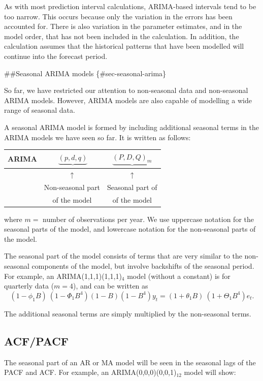 \documentclass[]{book}
\begin{document}
As with most prediction interval calculations, ARIMA-based intervals tend to be too narrow. This occurs because only the variation in the errors has been accounted for. There is also variation in the parameter estimates, and in the model order, that has not been included in the calculation. In addition, the calculation assumes that the historical patterns that have been modelled will continue into the forecast period.

\#\#Seasonal ARIMA models \{\#sec-seasonal-arima\}

So far, we have restricted our attention to non-seasonal data and non-seasonal ARIMA models. However, ARIMA models are also capable of modelling a wide range of seasonal data.

A seasonal ARIMA model is formed by including additional seasonal terms in the ARIMA models we have seen so far. It is written as follows:

\begin{longtable}[]{@{}rcc@{}}
\toprule
ARIMA & \(~\underbrace{(p, d, q)}\) & \(\underbrace{(P, D, Q)_{m}}\)\tabularnewline
\midrule
\endhead
& \({\uparrow}\) & \({\uparrow}\)\tabularnewline
& Non-seasonal part & Seasonal part of\tabularnewline
& of the model & of the model\tabularnewline
\bottomrule
\end{longtable}

where \(m =\) number of observations per year. We use uppercase notation for the seasonal parts of the model, and lowercase notation for the non-seasonal parts of the model.

The seasonal part of the model consists of terms that are very similar to the non-seasonal components of the model, but involve backshifts of the seasonal period. For example, an ARIMA(1,1,1)(1,1,1)\(_{4}\) model (without a constant) is for quarterly data (\(m=4\)), and can be written as
\[
  (1 - \phi_{1}B)~(1 - \Phi_{1}B^{4}) (1 - B) (1 - B^{4})y_{t} =
  (1 + \theta_{1}B)~ (1 + \Theta_{1}B^{4})e_{t}.
\]

The additional seasonal terms are simply multiplied by the non-seasonal terms.

\hypertarget{acfpacf}{%
\subsection*{ACF/PACF}\label{acfpacf}}

The seasonal part of an AR or MA model will be seen in the seasonal lags of the PACF and ACF. For example, an ARIMA(0,0,0)(0,0,1)\(_{12}\) model will show:
\end{document}
